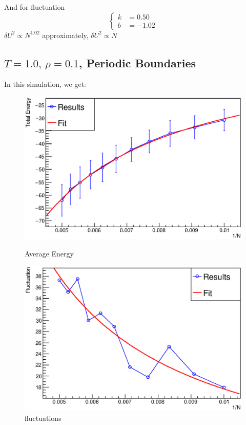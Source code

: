 \documentclass[UTF8,a4paper]{article}
\begin{document}
And for fluctuation
\begin{equation}
	\left\{
	\begin{aligned}
		k & = 0.50  \\
		b & = -1.02
	\end{aligned}
	\right.
\end{equation}
$\delta U^2\propto N^{1.02}$ approximately, $\delta U^2\propto N$

\subsection{$T =1.0,\, \rho = 0.1$, Periodic Boundaries}
In this simulation, we get:
\begin{figure}[H]
	\centering
	\begin{minipage}[t]{0.45\textwidth}
		\centering
		\includegraphics[height=0.2\textheight]{Root Fit/fit_exp2.eps}
		\caption{Average Energy}
	\end{minipage}\hspace{0.5cm}
	\begin{minipage}[t]{0.45\textwidth}
		\centering
		\includegraphics[height=0.2\textheight]{Root Fit/fit_exp2_f.eps}
		\caption{fluctuations}
	\end{minipage}
\end{figure}
\end{document}
